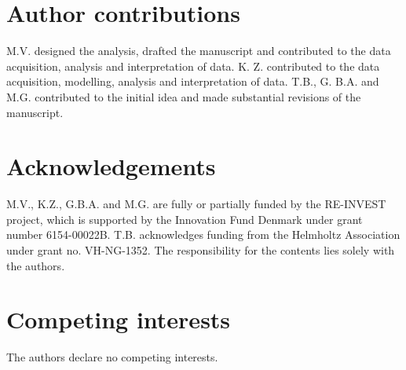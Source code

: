 \documentclass[5p]{elsarticle} %
\begin{document}
\section{Author contributions}

M.V. designed the analysis, drafted the manuscript and contributed to the data acquisition, analysis and interpretation of data. K. Z. contributed to the data acquisition, modelling, analysis and interpretation of data. T.B., G. B.A. and M.G. contributed to the initial idea and made substantial revisions of the manuscript. 

\section{Acknowledgements}
M.V., K.Z., G.B.A. and M.G. are fully or partially funded by the RE-INVEST project, which is supported by  the  Innovation  Fund  Denmark  under  grant  number  6154-00022B. T.B. acknowledges funding from the Helmholtz Association under grant no. VH-NG-1352. The responsibility for the contents lies solely with the authors.

\section{Competing interests}
The authors declare no competing interests.


\end{document}

